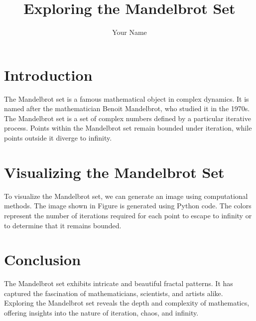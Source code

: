 \documentclass{article}
\title{Exploring the Mandelbrot Set}
\author{Your Name}
\begin{document}
\maketitle

\section{Introduction}
The Mandelbrot set is a famous mathematical object in complex dynamics. It is named after the mathematician Benoit Mandelbrot, who studied it in the 1970s. The Mandelbrot set is a set of complex numbers defined by a particular iterative process. Points within the Mandelbrot set remain bounded under iteration, while points outside it diverge to infinity.

\section{Visualizing the Mandelbrot Set}
To visualize the Mandelbrot set, we can generate an image using computational methods. The image shown in Figure is generated using Python code. The colors represent the number of iterations required for each point to escape to infinity or to determine that it remains bounded.


\section{Conclusion}
The Mandelbrot set exhibits intricate and beautiful fractal patterns. It has captured the fascination of mathematicians, scientists, and artists alike. Exploring the Mandelbrot set reveals the depth and complexity of mathematics, offering insights into the nature of iteration, chaos, and infinity.
\end{document}
